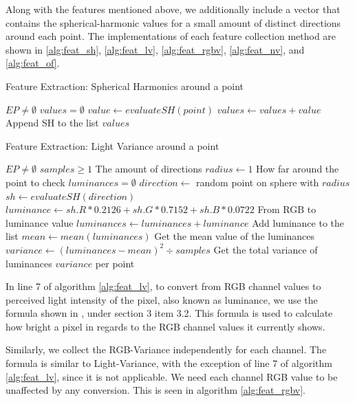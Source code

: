 Along with the features mentioned above, we additionally include a vector that contains the spherical-harmonic values for a small amount of distinct directions around each point. The implementations of each feature collection method are shown in \ref{alg:feat_sh}, \ref{alg:feat_lv}, \ref{alg:feat_rgbv}, \ref{alg:feat_nv}, and \ref{alg:feat_of}.


\begin{algorithm}
	\caption{Feature Extraction: Spherical Harmonics around a point}
	\label{alg:feat_sh}
	\begin{algorithmic}[1]
		\Require $EP \neq \emptyset$
		\State $values = \emptyset$
			\State $value \gets evaluateSH(point)$
			\State $values \gets values + value$ \Comment Append SH to the list
		\EndFor
		\State \Return $values$
	\end{algorithmic}
\end{algorithm}

\begin{algorithm}
	\caption{Feature Extraction: Light Variance around a point}
	\label{alg:feat_lv}
	\begin{algorithmic}[1]
		\Require $EP \neq \emptyset$
		\Require $samples \geq 1$ \Comment The amount of directions
		\State $radius \gets 1$ \Comment How far around the point to check
			\State $luminances = \emptyset$
				\State $direction \gets$ random point on sphere with $radius$
				\State $sh \gets evaluateSH(direction)$
				\State $luminance \gets sh.R * 0.2126 + sh.G * 0.7152 + sh.B * 0.0722$ \Comment From RGB to luminance value
				\label{alg:feat_lv:7}
				\State $luminances \gets luminances + luminance$ \Comment Add luminance to the list
			\EndFor
			\State $mean \gets mean(luminances)$ \Comment Get the mean value of the luminances
			\State $variance \gets (luminances - mean)^2 \div samples$ \Comment Get the total variance of luminances
		\EndFor
		\State \Return $variance$ per point
	\end{algorithmic}
\end{algorithm}

In line 7 of algorithm \ref{alg:feat_lv}, to convert from RGB channel values to perceived light intensity of the pixel, also known as luminance, we use the formula shown in \cite{Luminance2015}, under section 3 item 3.2. This formula is used to calculate how bright a pixel in regards to the RGB channel values it currently shows.

Similarly, we collect the RGB-Variance independently for each channel. The formula is similar to Light-Variance, with the exception of line 7 of algorithm \ref{alg:feat_lv}, since it is not applicable. We need each channel RGB value to be unaffected by any conversion. This is seen in algorithm \ref{alg:feat_rgbv}.

